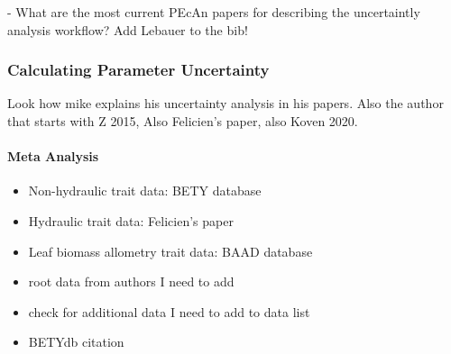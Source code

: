 - What are the most current PEcAn papers for describing the uncertaintly analysis workflow? Add Lebauer to the bib!


\subsubsection*{Calculating Parameter Uncertainty}

Look how mike explains his uncertainty analysis in his papers. Also the author that starts with Z 2015, Also Felicien's paper, also Koven 2020. 

\paragraph{Meta Analysis}

\begin{itemize}
    \item Non-hydraulic trait data: BETY database 
    \item Hydraulic trait data: Felicien's paper  
    \item Leaf biomass allometry trait data: BAAD database
    \item root data from authors I need to add
    \item check for additional data I need to add to data list
    \item BETYdb citation
\end{itemize}







